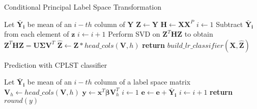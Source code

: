 \begin{algorithm}
    \caption{Conditional Principal Label Space Transformation}\label{alg:cplst1}
    \begin{algorithmic}[1]
            \State Let $\boldsymbol{\bar{Y}_i}$ be mean of an $i-th$ column of $\boldsymbol{Y}$
            \State $\boldsymbol{Z} \gets \boldsymbol{Y}$
            \State $\boldsymbol{H} \gets \boldsymbol{X}\boldsymbol{X}^P$
            \State $i \gets 1$
                \State Subtract $\boldsymbol{\bar{Y}_i}$ from each element of $\boldsymbol{z}$ 
                \State $i \gets i+1$ 
            \EndFor
            \State Perform SVD on $\boldsymbol{Z}^T\boldsymbol{H}\boldsymbol{Z}$ to obtain $\boldsymbol{Z}^T\boldsymbol{H}\boldsymbol{Z}=\boldsymbol{U}\boldsymbol{\Sigma} \boldsymbol{V}^T$
            \State $\boldsymbol{\hat{Z}} \gets \boldsymbol{Z} * head\_cols(\boldsymbol{V},h)$
            \State \textbf{return} $build\_lr\_classifier(\boldsymbol{X}, \boldsymbol{\hat{Z}})$
        \EndFunction
    \end{algorithmic}
\end{algorithm}


\begin{algorithm}
    \caption{Prediction with CPLST classifier}\label{alg:cplst2}
    \begin{algorithmic}[1]
            \State Let $\boldsymbol{\bar{Y}_i}$ be mean of an $i-th$ column of a label space matrix
            \State $\boldsymbol{V}_h \gets head\_cols(\boldsymbol{V}, h)$
            \State $\boldsymbol{y} \gets \boldsymbol{x}^T\boldsymbol{\beta}\boldsymbol{V}_h^T$
            \State $i \gets 1$
            \State $\boldsymbol{e} \gets \boldsymbol{e} + \boldsymbol{\bar{Y}_i}$
                \State $i \gets i+1$
            \EndFor
            \State \textbf{return} $round(y)$
        \EndFunction
    \end{algorithmic}
\end{algorithm}
